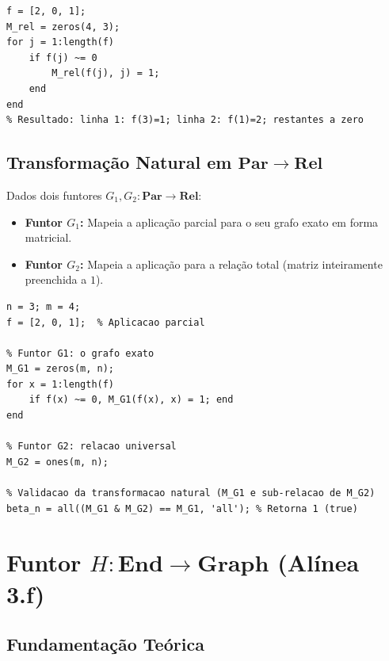 \begin{lstlisting}[style=matlab, caption={Funtor $G: \mathbf{Par} \to \mathbf{Rel}$ --- construção da matriz relacional}]
% f: 3 -> 4, onde f(2) e indefinido (representado por 0)
f = [2, 0, 1];
M_rel = zeros(4, 3);
for j = 1:length(f)
    if f(j) ~= 0
        M_rel(f(j), j) = 1;
    end
end
% Resultado: linha 1: f(3)=1; linha 2: f(1)=2; restantes a zero
\end{lstlisting}

\subsection{Transformação Natural em $\mathbf{Par} \to \mathbf{Rel}$}

Dados dois funtores $G_1, G_2: \mathbf{Par} \to \mathbf{Rel}$:
\begin{itemize}
    \item \textbf{Funtor $G_1$:} Mapeia a aplicação parcial para o seu grafo exato em forma matricial.
    \item \textbf{Funtor $G_2$:} Mapeia a aplicação para a relação total (matriz inteiramente preenchida a $1$).
\end{itemize}

\begin{lstlisting}[style=matlab, caption={Transformação natural $\beta: G_1 \Rightarrow G_2$ em $\mathbf{Par} \to \mathbf{Rel}$}]
n = 3; m = 4;
f = [2, 0, 1];  % Aplicacao parcial

% Funtor G1: o grafo exato
M_G1 = zeros(m, n);
for x = 1:length(f)
    if f(x) ~= 0, M_G1(f(x), x) = 1; end
end

% Funtor G2: relacao universal
M_G2 = ones(m, n);

% Validacao da transformacao natural (M_G1 e sub-relacao de M_G2)
beta_n = all((M_G1 & M_G2) == M_G1, 'all'); % Retorna 1 (true)
\end{lstlisting}

\section{Funtor $H: \mathbf{End} \to \mathbf{Graph}$ (Alínea 3.f)}
\label{sec:functor-end-graph}

\subsection{Fundamentação Teórica}

